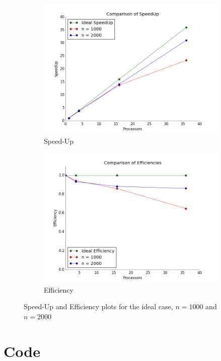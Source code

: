 \documentclass[a4paper]{article}
\begin{document}
    \begin{figure}[htp!]
      \centering
      \begin{subfigure}{.5\textwidth}
        \centering
        \includegraphics[width=.99\textwidth]{../2 Analysis/SpeedUp.png}
        \caption{Speed-Up}
        \label{fig:SpeedUp}
      \end{subfigure}%
      \begin{subfigure}{.5\textwidth}
        \centering
        \includegraphics[width=.99\textwidth]{../2 Analysis/Efficiency.png}
        \caption{Efficiency}
        \label{fig:Efficiency}
      \end{subfigure}
      \caption{Speed-Up and Efficiency plots for the ideal case, $n=1000$ and $n = 2000$}
    \end{figure}


\newpage
\appendix
\section{Code}
    
\end{document}
